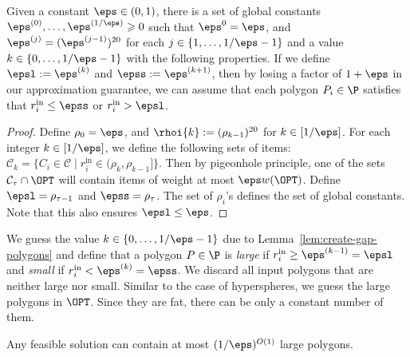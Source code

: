 \begin{lem}\label{lem:create-gap-polygons}
Given a constant $\eps\in(0,1)$, there is a
	set of global constants $\eps^{(0)},\ldots,\eps^{(1/\eps)}\geqslant 0$ such that
	$\eps^{0}=\eps$, and $\eps^{(j)}=(\eps^{(j-1)})^{20}$ for each $j\in\{1,\ldots,{1/\eps}-1\}$
	and a value $k\in\{0,\ldots,{1/\eps}-1\}$ with the following properties. If we define
	$\epsl:=\eps^{(k)}$ and $\epss:=\eps^{(k+1)}$, then by
	losing a factor of
 $1+\eps$ in our approximation
	guarantee, we can assume that each polygon $P_{i}\in\P$ satisfies
	that $r_{i}^{\mathrm{in}} \le \epss$ or $r_{i}^{\mathrm{in}} > \epsl$.

	\end{lem}
\begin{proof}
Define $\rho_0=\eps$, and $\rhoi{k} := (\rho_{k-1})^{20}$ for $k \in [1/\eps]$. For each integer $k \in [1/\eps]$,  we define the following sets of items:
$\mathcal{C}_k = \{C_i \in \mathcal{C} \mid r_{i}^{\mathrm{in}}  \in (\rho_{k},\rho_{k-1}]\}$.
Then by pigeonhole principle, one of the sets $\mathcal{C}_{\tau} \cap \OPT$ will contain items of weight at most $\eps w(\OPT)$.
Define $\epsl=\rho_{\tau-1}$ and $\epss=\rho_{\tau}$. The set of $\rho_i$'s defines the set of global constants. Note that this also ensures $\epsl\le \eps$.
\end{proof}


We guess the value $k\in\{0,\ldots,1/\eps-1\}$ due to Lemma~\ref{lem:create-gap-polygons}
and define that a polygon $P\in\P$ is \emph{large }if $r_{i}^{\mathrm{in}}\ge \eps^{(k-1)}=\epsl$
and \emph{small }if $r_{i}^{\mathrm{in}}<\eps^{(k)}=\epss$. We discard
all input polygons that are neither large nor small.
Similar to the case of hyperspheres, we guess the large polygons in
$\OPT$. Since they are fat, there can be only a constant number of
them.

\begin{prop} 
	\label{prop: finite_circle}
	Any feasible solution can contain at most $(1/\eps)^{O(1)}$
	large polygons. \end{prop}

